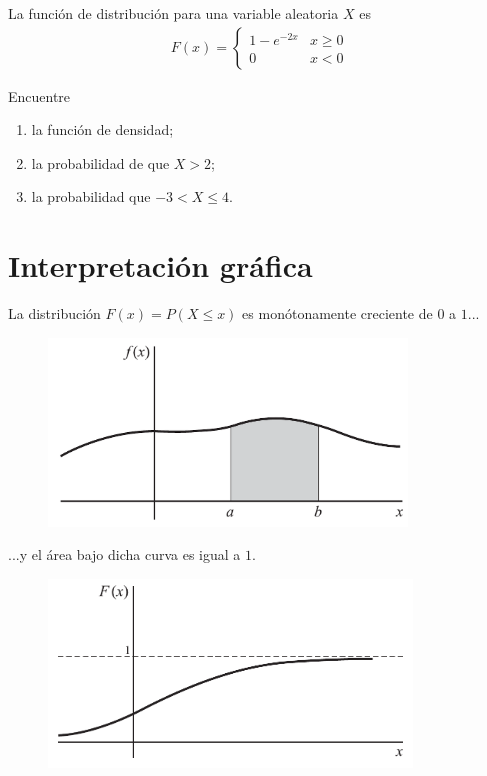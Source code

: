  \begin{ejemplo}
  \label{sol:2.7}
  La función de distribución para una variable aleatoria $X$ es
  \begin{align}
   F(x)=
   \begin{cases}
    1-e^{-2x} & x\geq 0 \\
    0 & x <0
   \end{cases}
  \end{align}

  Encuentre
  \begin{enumerate}
   \item la función de densidad;
   \item la probabilidad de que $X>2$;
   \item la probabilidad que $-3 < X \leq 4.$
  \end{enumerate}


 \end{ejemplo}



\section{Interpretación gráfica}


	La distribución $F(x)=P(X\leq x)$ es monótonamente creciente de $0$ a $1...$
	\begin{figure}
	\centering
	\includegraphics[height=5cm,keepaspectratio=true]{./pe/pands0202.png}
\end{figure}




  ...y el área bajo dicha curva es igual a $1.$
  \begin{figure}
	\centering
	\includegraphics[height=5cm,keepaspectratio=true]{./pe/pands0203.png}
\end{figure}




